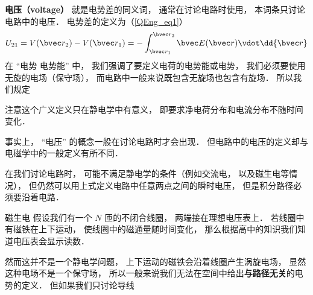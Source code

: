 

\textbf{电压（voltage）} 就是电势差的同义词， 通常在讨论电路时使用， 本词条只讨论电路中的电压． 电势差的定义为（\autoref{QEng_eq1}）
\begin{equation}\label{Voltag_eq1}
U_{21} = V(\bvec r_2) - V(\bvec r_1) = - \int_{\bvec r_1}^{\bvec r_2} \bvec E(\bvec r) \vdot \dd{\bvec r}
\end{equation}
在 “电势 电势能” 中， 我们强调了要定义电荷的电势能或电势， 我们必须要使用无旋的电场（保守场）， 而电路中一般来说既包含无旋场也包含有旋场． 所以我们规定



注意这个广义定义只在静电学中有意义， 即要求净电荷分布和电流分布不随时间变化．

事实上， “电压” 的概念一般在讨论电路时才会出现． 但电路中的电压的定义却与电磁学中的一般定义有所不同．

在我们讨论电路时， 可能不满足静电学的条件（例如交流电， 以及磁生电等情况）， 但仍然可以用上式定义电路中任意两点之间的瞬时电压， 但是积分路径必须要沿着电路．

\begin{exercise}{磁生电}
假设我们有一个 $N$ 匝的不闭合线圈， 两端接在理想电压表上． 若线圈中有磁铁在上下运动， 使线圈中的磁通量随时间变化， 那么根据高中的知识我们知道电压表会显示读数．

然而这并不是一个静电学问题， 上下运动的磁铁会沿着线圈产生涡旋电场， 显然这种电场不是一个保守场， 所以一般来说我们无法在空间中给出\textbf{与路径无关}的电势的定义． 但如果我们只讨论导线
\end{exercise}